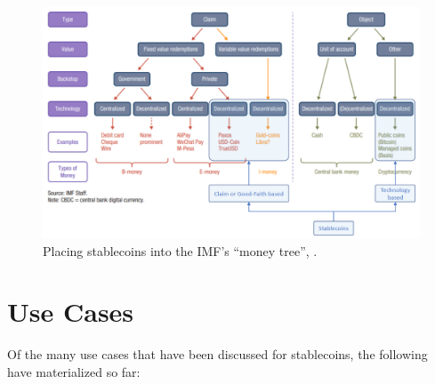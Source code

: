 \documentclass[conference]{IEEEtran}
\begin{document}
\begin{figure}[htbp]
	\centerline{
		\includegraphics[width=\linewidth]{moneyTree.png}
		}
	\caption{Placing stablecoins into the IMF's ``money tree'', \cite{IMF}.}
	\label{fig:monetarytree}
\end{figure}

\section{Use Cases}
\label{sec:usecases}
Of the many use cases that have been discussed for stablecoins, the following have materialized so far:
\end{document}
